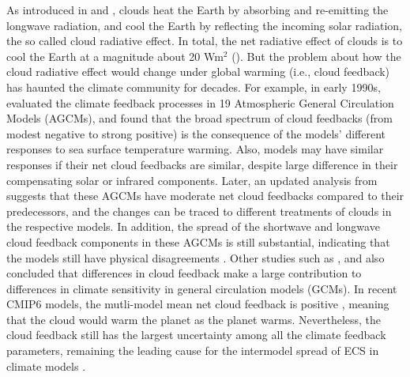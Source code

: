 As introduced in  and , clouds heat the Earth by absorbing and re-emitting the longwave radiation, and cool the Earth by reflecting the incoming solar radiation, the so called cloud radiative effect. In total, the net radiative effect of clouds is to cool the Earth at a magnitude about 20 Wm$^2$ (). But the problem about how the cloud radiative effect would change under global warming (i.e., cloud feedback) has haunted the climate community for decades. For example, in early 1990s, \cite{Cess1990intercomparison} evaluated the climate feedback processes in 19 Atmospheric General Circulation Models (AGCMs), and found that the broad spectrum of cloud feedbacks (from modest negative to strong positive) is the consequence of the models' different responses to sea surface temperature warming. Also, models may have similar responses if their net cloud feedbacks are similar, despite large difference in their compensating solar or infrared components. Later, an updated analysis from \cite{Cess1996cloud} suggests that these AGCMs have moderate net cloud feedbacks compared to their predecessors, and the changes can be traced to different treatments of clouds in the respective models. In addition, the spread of the shortwave and longwave cloud feedback components in these AGCMs is still substantial, indicating that the models still have physical disagreements \citep{Cess1996cloud}. Other studies such as \cite{Colman2003comparison}, \cite{Webb2006contribution} and \cite{Vial2013} also concluded that differences in cloud feedback make a large contribution to differences in climate sensitivity in general circulation models (GCMs). In recent CMIP6 models, the mutli-model mean net cloud feedback is positive \citep[see ;][]{Zelinka2020causes}, meaning that the cloud would warm the planet as the planet warms. Nevertheless, the cloud feedback still has the largest uncertainty among all the climate feedback parameters, remaining the leading cause for the intermodel spread of ECS in climate models \citep{Zelinka2020causes,Sherwood2020}. %


